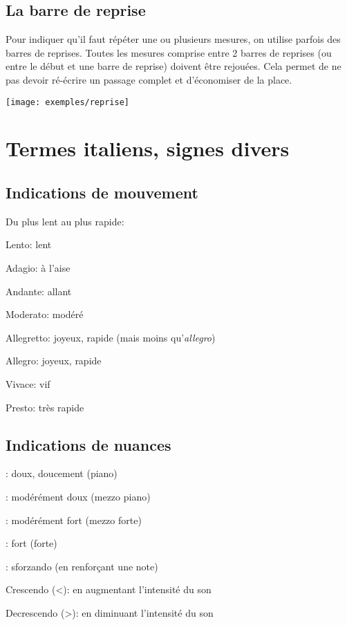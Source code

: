 \documentclass[11pt,a4paper]{scrreprt}
\begin{document}
\section{La barre de reprise}
Pour indiquer qu'il faut répéter une ou plusieurs mesures, on utilise parfois des barres de reprises. Toutes les mesures comprise entre 2 barres de reprises (ou entre le début et une barre de reprise) doivent être rejouées. Cela permet de ne pas devoir ré-écrire un passage complet et d'économiser de la place.

\texttt{[image: exemples/reprise]}


\chapter{Termes italiens, signes divers}
\section{Indications de mouvement}
Du plus lent au plus rapide:


\begin{description}
\item Lento: lent
\item Adagio: à l'aise
\item Andante: allant
\item Moderato: modéré
\item Allegretto: joyeux, rapide (mais moins qu'\emph{allegro})
\item Allegro: joyeux, rapide
\item Vivace: vif
\item Presto: très rapide
\end{description}

\section{Indications de nuances}
\begin{description}
\item \fetap : doux, doucement (piano)
\item \fetamp : modérément doux (mezzo piano)
\item \fetamf : modérément fort (mezzo forte)
\item \fetaf : fort (forte)
\item \fetasfz : sforzando (en renforçant une note)
\item Crescendo (<): en augmentant l'intensité du son
\item Decrescendo (>): en diminuant l'intensité du son
\end{description}
\end{document}
